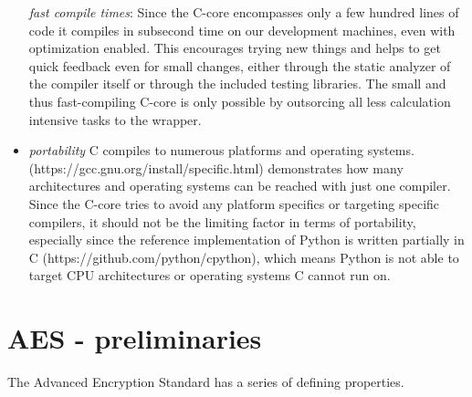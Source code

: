 \begin{itemize}
  \emph{fast compile times}: Since the C-core encompasses only a few
  hundred lines of code it compiles in subsecond time on our development
  machines, even with optimization enabled. This encourages trying new
  things and helps to get quick feedback even for small changes, either
  through the static analyzer of the compiler itself or through the
  included testing libraries. The small and thus fast-compiling C-core
  is only possible by outsorcing all less calculation intensive tasks to
  the wrapper.
\item
  \emph{portability} C compiles to numerous platforms and operating
  systems. (https://gcc.gnu.org/install/specific.html) demonstrates how
  many architectures and operating systems can be reached with just one
  compiler. Since the C-core tries to avoid any platform specifics or
  targeting specific compilers, it should not be the limiting factor in
  terms of portability, especially since the reference implementation of
  Python is written partially in C (https://github.com/python/cpython),
  which means Python is not able to target CPU architectures or
  operating systems C cannot run on.
\end{itemize}

\hypertarget{aes---preliminaries}{%
\section{AES - preliminaries}\label{aes---preliminaries}}

The Advanced Encryption Standard has a series of defining properties.

